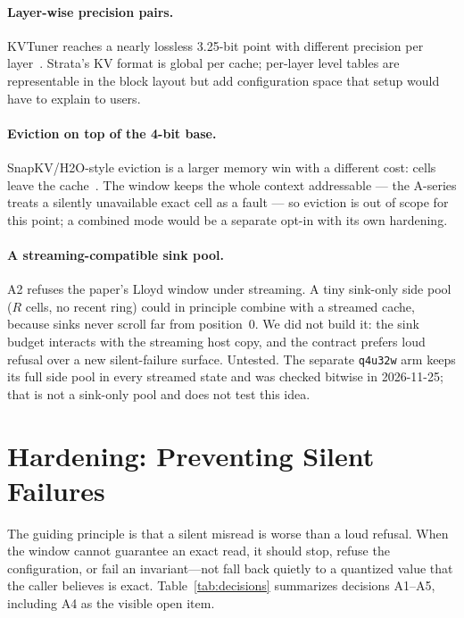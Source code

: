 \documentclass[10pt,twocolumn]{article}
\begin{document}
\paragraph{Layer-wise precision pairs.} KVTuner reaches a nearly lossless 3.25-bit point with different precision per layer~\cite{kvtuner}. Strata's KV format is global per cache; per-layer level tables are representable in the block layout but add configuration space that setup would have to explain to users.

\paragraph{Eviction on top of the 4-bit base.} SnapKV/H2O-style eviction is a larger memory win with a different cost: cells leave the cache~\cite{snapkv,h2o}. The window keeps the whole context addressable --- the A-series treats a silently unavailable exact cell as a fault --- so eviction is out of scope for this point; a combined mode would be a separate opt-in with its own hardening.

\paragraph{A streaming-compatible sink pool.} A2 refuses the paper's Lloyd window under streaming. A tiny sink-only side pool ($R$ cells, no recent ring) could in principle combine with a streamed cache, because sinks never scroll far from position~0. We did not build it: the sink budget interacts with the streaming host copy, and the contract prefers loud refusal over a new silent-failure surface. Untested. The separate \texttt{q4u32w} arm keeps its full side pool in every streamed state and was checked bitwise in 2026-11-25; that is not a sink-only pool and does not test this idea.

\section{Hardening: Preventing Silent Failures}

The guiding principle is that a silent misread is worse than a loud refusal. When the window cannot guarantee an exact read, it should stop, refuse the configuration, or fail an invariant---not fall back quietly to a quantized value that the caller believes is exact. Table~\ref{tab:decisions} summarizes decisions A1--A5, including A4 as the visible open item.
\end{document}
